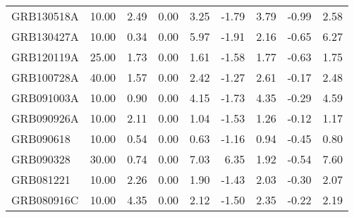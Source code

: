 \begin{tabular}{lrrrrrrrr}
GRB130518A & 10.00 & 2.49 & 0.00 & 3.25 & -1.79 & 3.79 & -0.99 & 2.58 \\
GRB130427A & 10.00 & 0.34 & 0.00 & 5.97 & -1.91 & 2.16 & -0.65 & 6.27 \\
GRB120119A & 25.00 & 1.73 & 0.00 & 1.61 & -1.58 & 1.77 & -0.63 & 1.75 \\
GRB100728A & 40.00 & 1.57 & 0.00 & 2.42 & -1.27 & 2.61 & -0.17 & 2.48 \\
GRB091003A & 10.00 & 0.90 & 0.00 & 4.15 & -1.73 & 4.35 & -0.29 & 4.59 \\
GRB090926A & 10.00 & 2.11 & 0.00 & 1.04 & -1.53 & 1.26 & -0.12 & 1.17 \\
GRB090618 & 10.00 & 0.54 & 0.00 & 0.63 & -1.16 & 0.94 & -0.45 & 0.80 \\
GRB090328 & 30.00 & 0.74 & 0.00 & 7.03 & 6.35 & 1.92 & -0.54 & 7.60 \\
GRB081221 & 10.00 & 2.26 & 0.00 & 1.90 & -1.43 & 2.03 & -0.30 & 2.07 \\
GRB080916C & 10.00 & 4.35 & 0.00 & 2.12 & -1.50 & 2.35 & -0.22 & 2.19 \\
\bottomrule
\end{tabular}
